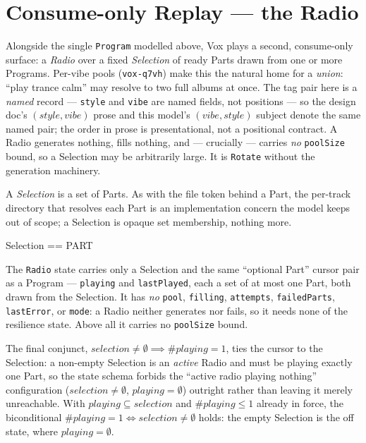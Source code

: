 \documentclass[a4paper,10pt,fleqn]{article}
\begin{document}
\section{Consume-only Replay --- the Radio}
\label{sec:radio}

Alongside the single \texttt{Program} modelled above, Vox plays a second,
consume-only surface: a \emph{Radio} over a fixed \emph{Selection} of ready
Parts drawn from one or more Programs. Per-vibe pools (\texttt{vox-q7vh}) make
this the natural home for a \emph{union}: ``play trance calm'' may resolve to
two full albums at once. The tag pair here is a \emph{named} record ---
\texttt{style} and \texttt{vibe} are named fields, not positions --- so the
design doc's $(style, vibe)$ prose and this model's $(vibe, style)$ subject
denote the same named pair; the order in prose is presentational, not a
positional contract. A Radio generates nothing, fills nothing, and ---
crucially --- carries \emph{no} \texttt{poolSize} bound, so a Selection may be
arbitrarily large. It is \texttt{Rotate} without the generation machinery.

A \emph{Selection} is a set of Parts. As with the file token behind a Part, the
per-track directory that resolves each Part is an implementation concern the
model keeps out of scope; a Selection is opaque set membership, nothing more.

\begin{zed}
  Selection == \power PART
\end{zed}

The \texttt{Radio} state carries only a Selection and the same ``optional Part''
cursor pair as a Program --- \texttt{playing} and \texttt{lastPlayed}, each a set
of at most one Part, both drawn from the Selection. It has \emph{no}
\texttt{pool}, \texttt{filling}, \texttt{attempts}, \texttt{failedParts},
\texttt{lastError}, or \texttt{mode}: a Radio neither generates nor fails, so it
needs none of the resilience state. Above all it carries no \texttt{poolSize}
bound.

The final conjunct, $selection \neq \emptyset \implies \# playing = 1$, ties the
cursor to the Selection: a non-empty Selection is an \emph{active} Radio and must
be playing exactly one Part, so the state schema forbids the ``active radio
playing nothing'' configuration ($selection \neq \emptyset$, $playing =
\emptyset$) outright rather than leaving it merely unreachable. With
$playing \subseteq selection$ and $\# playing \leq 1$ already in force, the
biconditional $\# playing = 1 \iff selection \neq \emptyset$ holds: the empty
Selection is the off state, where $playing = \emptyset$.
\end{document}
